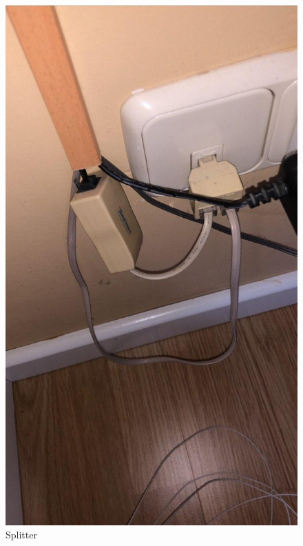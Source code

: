 \documentclass{article}[12 pt]
\begin{document}
			\begin{figure}
				\centering
				\includegraphics[scale=0.2]{splitter.jpg}
				\caption{Splitter}
				\label{f:splitter}
			\end{figure}
\end{document}
